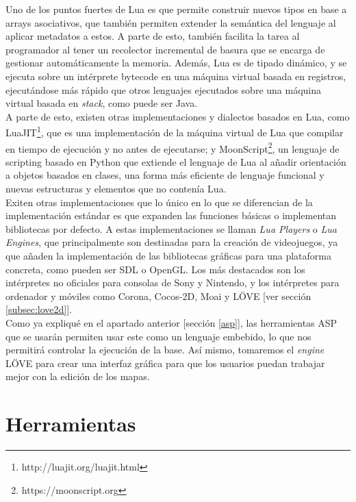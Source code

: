 Uno de los puntos fuertes de Lua es que permite construir nuevos tipos en base a arrays asociativos, que también permiten extender la semántica del lenguaje al aplicar metadatos a estos. A parte de esto, también facilita la tarea al programador al tener un recolector incremental de basura que se encarga de gestionar automáticamente la memoria. Además, Lua es de tipado dinámico, y se ejecuta sobre un intérprete bytecode en una máquina virtual basada en registros, ejecutándose más rápido que otros lenguajes ejecutados sobre una máquina virtual basada en \textit{stack}, como puede ser Java. \\

A parte de esto, existen otras implementaciones y dialectos basados en Lua, como LuaJIT\footnote{http://luajit.org/luajit.html}, que es una implementación de la máquina virtual de Lua que compilar en tiempo de ejecución y no antes de ejecutarse; y MoonScript\footnote{https://moonscript.org}, un lenguaje de scripting basado en Python que extiende el lenguaje de Lua al añadir orientación a objetos basados en clases, una forma más eficiente de lenguaje funcional y nuevas estructuras y elementos que no contenía Lua. \\

Exiten otras implementaciones que lo único en lo que se diferencian de la implementación estándar es que expanden las funciones básicas o implementan bibliotecas por defecto. A estas implementaciones se llaman \textit{Lua Players} o \textit{Lua Engines}, que principalmente son destinadas para la creación de videojuegos, ya que añaden la implementación de las bibliotecas gráficas para una plataforma concreta, como pueden ser SDL o OpenGL. Los más destacados son los intérpretes no oficiales para consolas de Sony y Nintendo, y los intérpretes para ordenador y móviles como Corona, Cocos-2D, Moai y LÖVE [ver sección \ref{subsec:love2d}]. \\

Como ya expliqué en el apartado anterior [sección \ref{asp}], las herramientas ASP que se usarán permiten usar este como un lenguaje embebido, lo que nos permitirá controlar la ejecución de la base. Así mismo, tomaremos el \textit{engine} LÖVE para crear una interfaz gráfica para que los usuarios puedan trabajar mejor con la edición de los mapas.

\section{Herramientas}

